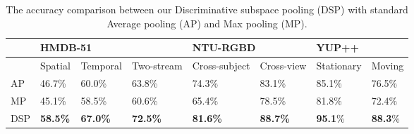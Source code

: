 \documentclass[runningheads]{llncs}
\newcommand{\comment}[1]{}
\begin{document}
\begin{table}[t]
\centering
\begin{tabular}{|l|l|l|l|l|l|l|l|}
\hline
    & \multicolumn{3}{l|}{HMDB-51}    & \multicolumn{2}{l|}{NTU-RGBD} & \multicolumn{2}{l|}{YUP++} \\ \hline
    & Spatial & Temporal & Two-stream & Cross-subject   & Cross-view  & Stationary     & Moving    \\ \hline
AP  & 46.7\%~\cite{feichtenhofer2016convolutional}  & 60.0\%~\cite{feichtenhofer2016convolutional}   & 63.8\%~\cite{feichtenhofer2016convolutional}     & 74.3\%~\cite{soo2017interpretable}          & 83.1\%~\cite{soo2017interpretable}      & 85.1\%         & 76.5\%    \\ \hline
MP  & 45.1\%  & 58.5\%   & 60.6\%     & 65.4\%          & 78.5\%      & 81.8\%         & 72.4\%    \\ \hline
DSP & \textbf{58.5\%}  & \textbf{67.0\%}   & \textbf{72.5\%}     & \textbf{81.6\%}          & \textbf{88.7\%}      & \textbf{95.1}\%         & \textbf{88.3}\%    \\ \hline
\end{tabular}
\caption{The accuracy comparison between our Discriminative subspace pooling (DSP) with standard Average pooling (AP) and Max pooling (MP).}
\label{table:1}
\end{table}
\comment{
\subsection{Parameter analysis}
In the Figure~\ref{subfig:2}, we present how the accuracy changes with and without embedding temporal order in different number of hyperplanes. As is clear, embedding temporal constraint will help the discriminative subspace to get a better representation. In terms of the number of hyperplanes, the accuracy increases about $3\%$ from 1 hyperplane to 6 hyperplanes, and drops around $0.5\%$ from 6 hyperplanes to 15 hyperplanes, which means a number of hyperplanes (6 in this case) is enough for capturing the discriminative feature of the sequence, redundant ones would catch the repeated information and cause confusion for the classifier. Additionally, in Figure~\ref{subfig:3}, we compare the accuracy with adversarial noise in different fooling rate. The higher the fooling rate is, the more adversarial noise will capture the information of the feature in different classes, which result in a better performance. Interestingly, our algorithm could performance relatively well without requiring a very high value of fooling rate of the adversarial noise From ~\cite{moosavi2017universal}, a lower fooling rate would reduce the amount of data that is used for generating the adversarial noise, which make the entire algorithm more computationally cheap.
}
\end{document}
